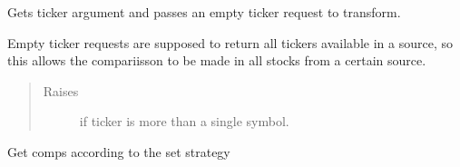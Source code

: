 \documentclass[letterpaper,10pt,english]{sphinxmanual}
\begin{document}
\begin{fulllineitems}
\begin{fulllineitems}
\label{\detokenize{dalio.pipe:dalio.pipe.builders.StockComps.run}}
Gets ticker argument and passes an empty ticker request to
transform.

Empty ticker requests are supposed to return all tickers available in
a source, so this allows the compariisson to be made in all stocks
from a certain source.
\begin{quote}\begin{description}
\item[{Raises}] \leavevmode
{} \textendash{} if ticker is more than a single symbol.

\end{description}\end{quote}

\end{fulllineitems}


\begin{fulllineitems}
\label{\detokenize{dalio.pipe:dalio.pipe.builders.StockComps.transform}}
Get comps according to the set strategy

\end{fulllineitems}


\end{fulllineitems}

\end{document}
